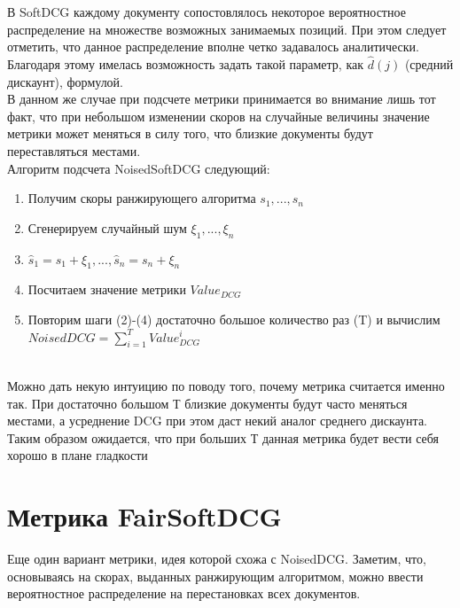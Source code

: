\documentclass[14pt,a4paper]{amsart}
\theoremstyle{definition}
\theoremstyle{definition}
\newcommand{\Sum}{\sum\limits}
\begin{document}
В SoftDCG каждому документу сопостовлялось некоторое вероятностное распределение на множестве возможных занимаемых позиций. При этом следует отметить, что данное распределение вполне четко задавалось аналитически. Благодаря этому имелась возможность задать такой параметр, как $\hat{d}(j)$ (средний дискаунт), формулой. \\

В данном же случае при подсчете метрики принимается во внимание лишь тот факт, что при небольшом изменении скоров на случайные величины значение метрики может меняться в силу того, что близкие документы будут переставляться местами. \\

Алгоритм подсчета NoisedSoftDCG следующий:

\begin{enumerate}
\item Получим скоры ранжирующего алгоритма $s_1,...,s_n$
\item Сгенерируем случайный шум $\xi_1,...,\xi_n$
\item $\hat{s}_1=s_1 + \xi_1,...,\hat{s}_n=s_n + \xi_n$
\item Посчитаем значение метрики $Value_{DCG}$
\item Повторим шаги (2)-(4) достаточно большое количество раз (T) и вычислим 
$NoisedDCG = \Sum_{i=1}^T Value_{DCG}^i$
\end{enumerate}

~\\

Можно дать некую интуицию по поводу того, почему метрика считается именно так. При достаточно большом Т близкие документы будут часто меняться местами, а усреднение DCG при этом даст некий аналог среднего дискаунта. Таким образом ожидается, что при больших Т данная метрика будет вести себя хорошо в плане гладкости  



\newpage
\section{Метрика FairSoftDCG}

Еще один вариант метрики, идея которой схожа с NoisedDCG. Заметим, что, основываясь на скорах, выданных ранжирующим алгоритмом, можно ввести вероятностное распределение на перестановках всех документов. \\
\end{document}
